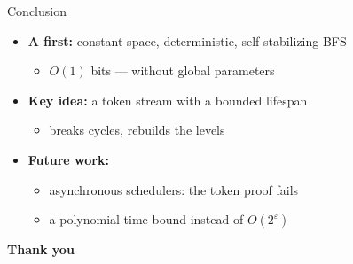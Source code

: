 \documentclass[aspectratio=169,11pt]{beamer}
\newcommand{\bodyfont}{\footnotesize}
\begin{document}
\begin{frame}{Conclusion}
\bodyfont
\begin{itemize}\setlength\itemsep{4pt}
\item \textbf{A first:} constant-space, deterministic, self-stabilizing BFS
  \begin{itemize}\setlength\itemsep{1pt}
  \item $O(1)$ bits --- without global parameters
  \end{itemize}
\item \textbf{Key idea:} a token stream with a bounded lifespan
  \begin{itemize}\setlength\itemsep{1pt}
  \item breaks cycles, rebuilds the levels
  \end{itemize}
\item \textbf{Future work:}
  \begin{itemize}\setlength\itemsep{1pt}
  \item asynchronous schedulers: the token proof fails
  \item a polynomial time bound instead of $O(2^{\varepsilon})$
  \end{itemize}
\end{itemize}
\end{frame}

\begin{frame}[plain]
\vfill
\begin{center}
  {\Huge\bfseries Thank you}
\end{center}
\vfill
\end{frame}
\end{document}
